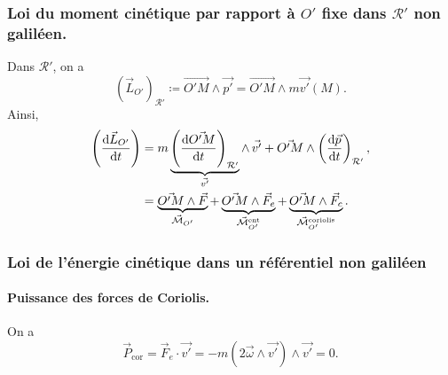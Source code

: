         \subsubsection{Loi du moment cinétique par rapport à $O'$ fixe dans $\mathcal{R}'$ non galiléen.}

            Dans $\mathcal{R}'$, on a
            \begin{equation}
                \left(\vec{L}_{O'}\right)_{\mathcal{R}'}\coloneqq\vec{O'M}\wedge\vec{p'}=\vec{O'M}\wedge m\vec{v'}(M).
            \end{equation}
            Ainsi,
            \begin{align}
                \left(\frac{\mathrm{d} \vec{L}_{O'}}{\mathrm{d} t}\right)
                &=
                m\underbrace{\left(\frac{\mathrm{d} \vec{O'M}}{\mathrm{d} t}\right)_{\mathcal{R}'}}_{\vec{v'}}\wedge\,\vec{v'}+\vec{O'M}\wedge\left(\frac{\mathrm{d}\vec{p}}{\mathrm{d} t}\right)_{\mathcal{R}'},\\
                &=\underbrace{\vec{O'M}\wedge \vec{F}}_{\vec{\mathcal{M}}_{O'}}+\underbrace{\vec{O'M}\wedge\vec{F}_e}_{\vec{\mathcal{M}}^{\text{ent}}_{O'}}+\underbrace{\vec{O'M}\wedge\vec{F}_c}_{\vec{\mathcal{M}}^{\text{coriolis}}_{O'}}.
            \end{align}

        \subsubsection{Loi de l'énergie cinétique dans un référentiel non galiléen}
            
            \paragraph{Puissance des forces de Coriolis.}
                On a 
                \begin{equation}
                    \vec{P}_{\text{cor}}=\vec{F}_e\cdot\vec{v'}=-m\left(2\vec{\omega}\wedge\vec{v'}\right)\wedge\vec{v'}=0.
                \end{equation}
            

